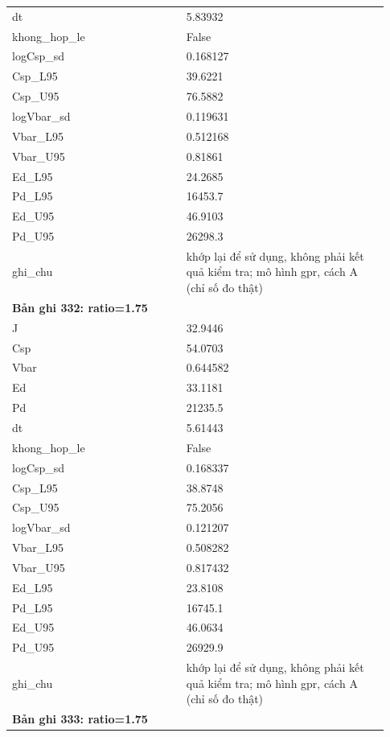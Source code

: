 \begin{longtable}{p{0.43\linewidth}p{0.50\linewidth}}
dt & 5.83932 \\
khong\_\allowbreak hop\_\allowbreak le & False \\
logCsp\_\allowbreak sd & 0.168127 \\
Csp\_\allowbreak L95 & 39.6221 \\
Csp\_\allowbreak U95 & 76.5882 \\
logVbar\_\allowbreak sd & 0.119631 \\
Vbar\_\allowbreak L95 & 0.512168 \\
Vbar\_\allowbreak U95 & 0.81861 \\
Ed\_\allowbreak L95 & 24.2685 \\
Pd\_\allowbreak L95 & 16453.7 \\
Ed\_\allowbreak U95 & 46.9103 \\
Pd\_\allowbreak U95 & 26298.3 \\
ghi\_\allowbreak chu & khớp lại để sử dụng, không phải kết quả kiểm tra; mô hình gpr, cách A (chỉ số đo thật) \\
\midrule
\multicolumn{2}{p{0.95\linewidth}}{\textbf{Bản ghi 332: ratio=1.75}} \\
J & 32.9446 \\
Csp & 54.0703 \\
Vbar & 0.644582 \\
Ed & 33.1181 \\
Pd & 21235.5 \\
dt & 5.61443 \\
khong\_\allowbreak hop\_\allowbreak le & False \\
logCsp\_\allowbreak sd & 0.168337 \\
Csp\_\allowbreak L95 & 38.8748 \\
Csp\_\allowbreak U95 & 75.2056 \\
logVbar\_\allowbreak sd & 0.121207 \\
Vbar\_\allowbreak L95 & 0.508282 \\
Vbar\_\allowbreak U95 & 0.817432 \\
Ed\_\allowbreak L95 & 23.8108 \\
Pd\_\allowbreak L95 & 16745.1 \\
Ed\_\allowbreak U95 & 46.0634 \\
Pd\_\allowbreak U95 & 26929.9 \\
ghi\_\allowbreak chu & khớp lại để sử dụng, không phải kết quả kiểm tra; mô hình gpr, cách A (chỉ số đo thật) \\
\midrule
\multicolumn{2}{p{0.95\linewidth}}{\textbf{Bản ghi 333: ratio=1.75}} \\

\end{longtable}
